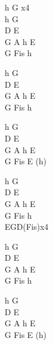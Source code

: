 \begin{chord}
    h G x4\\
    h G\\
    D E\\
    G A h E\\
    G Fis h

    h G\\
    D E\\
    G A h E\\
    G Fis h

    h G\\
    D E\\
    G A h E\\
    G Fis E (h)

    h G\\
    D E\\
    G A h E\\
    G Fis h\\
    EGD(Fis)x4

    h G\\
    D E\\
    G A h E\\
    G Fis h

    h G\\
    D E\\
    G A h E\\
    G Fis E (h)
\end{chord}